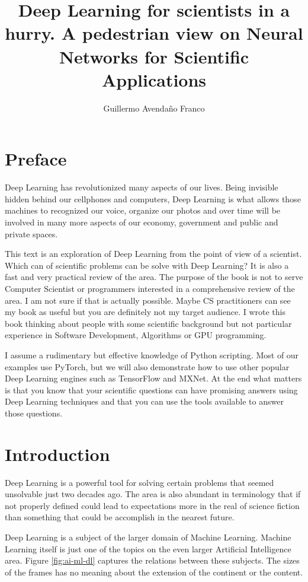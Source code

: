 \documentclass[10pt]{book}
\title{Deep Learning for scientists in a hurry. A pedestrian view on Neural Networks for Scientific Applications}
\author{Guillermo Avenda\~no Franco}
\begin{document}
\maketitle
\tableofcontents

\chapter*{Preface}

Deep Learning has revolutionized many aspects of our lives. Being invisible hidden behind our cellphones and computers, Deep Learning is what allows those machines to recognized our voice, organize our photos and over time will be involved in many more aspects of our economy, government and public and private spaces.

This text is an exploration of Deep Learning from the point of view of a scientist. Which can of scientific problems can be solve with Deep Learning? 
It is also a fast and very practical review of the area. The purpose of the book is not to serve Computer Scientist or programmers interested in a comprehensive review of the area. I am not sure if that is actually possible. Maybe CS practitioners can see my book as useful but you are definitely not my target audience. I wrote this book thinking about people with some scientific background but not particular experience in Software Development, Algorithms or GPU programming. 

I assume a rudimentary but effective knowledge of Python scripting. Most of our examples use PyTorch, but we will also demonstrate how to use other popular Deep Learning engines such as TensorFlow and MXNet. At the end what matters is that you know that your scientific questions can have promising answers using Deep Learning techniques and that you can use the tools available to answer those questions.


\chapter{Introduction}

Deep Learning is a powerful tool for solving certain problems that seemed unsolvable just two decades ago. 
The area is also abundant in terminology that if not properly defined could lead to expectations more in the real of science fiction than something that could be accomplish in the nearest future.

Deep Learning is a subject of the larger domain of Machine Learning.
Machine Learning itself is just one of the topics on the even larger Artificial Intelligence area. 
Figure \ref{fig:ai-ml-dl} captures the relations between these subjects. The sizes of the frames has no meaning about the extension of the continent or the content. 
\end{document}
